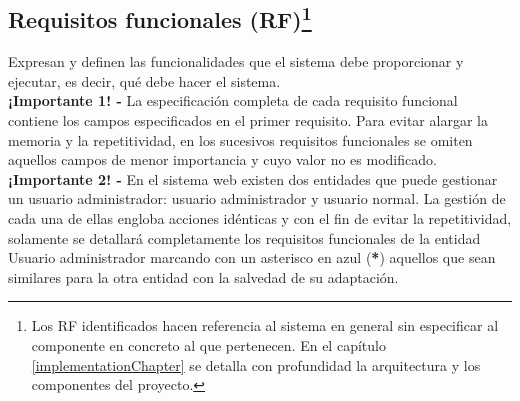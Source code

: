\documentclass[12pt,a4paper, twoside]{report}
\begin{document}
	\subsection[Requisitos funcionales (RF)]{Requisitos funcionales (RF)\footnote{Los RF identificados hacen referencia al sistema en general sin especificar al componente en concreto al que pertenecen. En el capítulo \ref{implementationChapter} se detalla con profundidad la arquitectura y los componentes del proyecto.}}
	
	Expresan y definen las funcionalidades que el sistema debe proporcionar y ejecutar, es decir, qué debe hacer el sistema. \\
	
	\textbf{¡Importante 1! -} La especificación completa de cada requisito funcional contiene los campos especificados en el primer requisito. Para evitar alargar la memoria y la repetitividad, en los sucesivos requisitos funcionales se omiten aquellos campos de menor importancia y cuyo valor no es modificado. \\

	\textbf{¡Importante 2! -} En el sistema web existen dos entidades que puede gestionar un usuario administrador: usuario administrador y usuario normal. La gestión de cada una de ellas engloba acciones idénticas y con el fin de evitar la repetitividad, solamente se detallará completamente los requisitos funcionales de la entidad Usuario administrador marcando con un asterisco en azul (\textbf{{\color{black!40!blue}*}}) aquellos que sean similares para la otra entidad con la salvedad de su adaptación. \\
	
\end{document}
